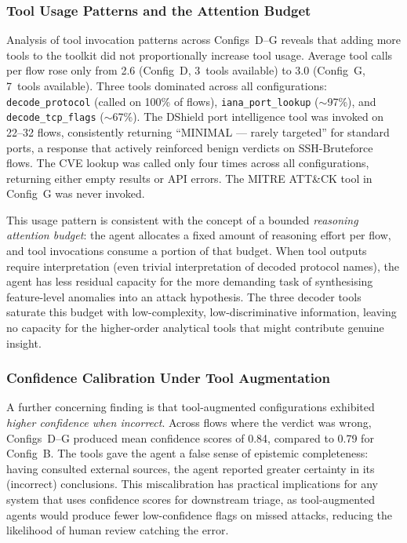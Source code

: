 \documentclass[../main.tex]{subfiles}
\begin{document}
\subsubsection{Tool Usage Patterns and the Attention Budget}

Analysis of tool invocation patterns across Configs~D--G reveals that adding more tools to the toolkit did not proportionally increase tool usage. Average tool calls per flow rose only from 2.6 (Config~D, 3~tools available) to 3.0 (Config~G, 7~tools available). Three tools dominated across all configurations: \texttt{decode\_protocol} (called on 100\% of flows), \texttt{iana\_port\_lookup} ($\sim$97\%), and \texttt{decode\_tcp\_flags} ($\sim$67\%). The DShield port intelligence tool was invoked on 22--32 flows, consistently returning ``MINIMAL --- rarely targeted'' for standard ports, a response that actively reinforced benign verdicts on SSH-Bruteforce flows. The CVE lookup was called only four times across all configurations, returning either empty results or API errors. The MITRE ATT\&CK tool in Config~G was never invoked.

This usage pattern is consistent with the concept of a bounded \textit{reasoning attention budget}: the agent allocates a fixed amount of reasoning effort per flow, and tool invocations consume a portion of that budget. When tool outputs require interpretation (even trivial interpretation of decoded protocol names), the agent has less residual capacity for the more demanding task of synthesising feature-level anomalies into an attack hypothesis. The three decoder tools saturate this budget with low-complexity, low-discriminative information, leaving no capacity for the higher-order analytical tools that might contribute genuine insight.

\subsubsection{Confidence Calibration Under Tool Augmentation}

A further concerning finding is that tool-augmented configurations exhibited \textit{higher confidence when incorrect}. Across flows where the verdict was wrong, Configs~D--G produced mean confidence scores of 0.84, compared to 0.79 for Config~B. The tools gave the agent a false sense of epistemic completeness: having consulted external sources, the agent reported greater certainty in its (incorrect) conclusions. This miscalibration has practical implications for any system that uses confidence scores for downstream triage, as tool-augmented agents would produce fewer low-confidence flags on missed attacks, reducing the likelihood of human review catching the error.
\end{document}
